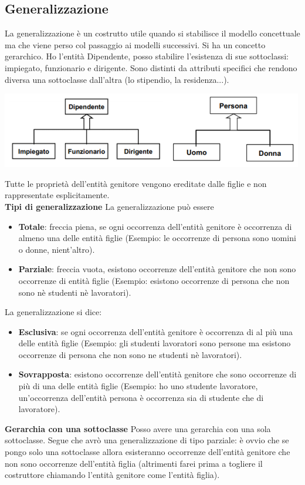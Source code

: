 \subsection{Generalizzazione}
La generalizzazione è un costrutto utile quando si stabilisce il modello concettuale ma che viene perso col passaggio ai modelli successivi. Si ha un concetto gerarchico. Ho l'entità Dipendente, posso stabilire l'esistenza di sue sottoclassi: impiegato, funzionario e dirigente. Sono distinti da attributi specifici che rendono diversa una sottoclasse dall'altra (lo stipendio, la residenza...).
\begin{center}\includegraphics{images/23.PNG}\end{center}
Tutte le proprietà dell'entità genitore vengono ereditate dalle figlie e non rappresentate esplicitamente.\\
\textbf{Tipi di generalizzazione} La generalizzazione può essere
\begin{itemize}
	\item \textbf{Totale}: freccia piena, se ogni occorrenza dell'entità genitore è occorrenza di almeno una delle entità figlie (Esempio: le occorrenze di persona sono uomini o donne, nient'altro).
	\item \textbf{Parziale}: freccia vuota, esistono occorrenze dell'entità genitore che non sono occorrenze di entità figlie (Esempio: esistono occorrenze di persona che non sono nè studenti nè lavoratori).
\end{itemize}
La generalizzazione si dice:
\begin{itemize}
	\item \textbf{Esclusiva}: se ogni occorrenza dell'entità genitore è occorrenza di al più una delle entità figlie (Esempio: gli studenti lavoratori sono persone ma esistono occorrenze di persona che non sono ne studenti nè lavoratori).
	\item \textbf{Sovrapposta}: esistono occorrenze dell'entità genitore che sono occorrenze di più di una delle entità figlie (Esempio: ho uno studente lavoratore, un'occorrenza dell'entità persona è occorrenza sia di studente che di lavoratore).
\end{itemize}
\textbf{Gerarchia con una sottoclasse} Posso avere una gerarchia con una sola sottoclasse. Segue che avrò una generalizzazione di tipo parziale: è ovvio che se pongo solo una sottoclasse allora esisteranno occorrenze dell'entità genitore che non sono occorrenze dell'entità figlia (altrimenti farei prima a togliere il costruttore chiamando l'entità genitore come l'entità figlia).\\
